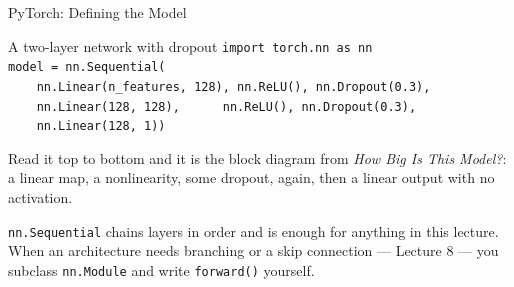\documentclass[aspectratio=169, 11pt]{beamer}
\begin{document}
\begin{frame}{PyTorch: Defining the Model}
  \begin{examplebox}{A two-layer network with dropout}
    {\scriptsize\linespread{1.15}\selectfont
    \texttt{import torch.nn as nn}\\[2pt]
    \texttt{model = nn.Sequential(}\\
    \texttt{\mbox{}\ \ \ \ nn.Linear(n\_features, 128), nn.ReLU(), nn.Dropout(0.3),}\\
    \texttt{\mbox{}\ \ \ \ nn.Linear(128, 128),\ \ \ \ \ \ nn.ReLU(), nn.Dropout(0.3),}\\
    \texttt{\mbox{}\ \ \ \ nn.Linear(128, 1))}
    }
  \end{examplebox}
  Read it top to bottom and it is the block diagram from \emph{How Big Is This Model?}: a linear
  map, a nonlinearity, some dropout, again, then a linear output with no activation.

  \vspace{0.15cm}
  \texttt{nn.Sequential} chains layers in order and is enough for anything in this lecture. When
  an architecture needs branching or a skip connection --- Lecture 8 --- you subclass
  \texttt{nn.Module} and write \texttt{forward()} yourself.

  \vspace{0.15cm}
\end{frame}
\end{document}

